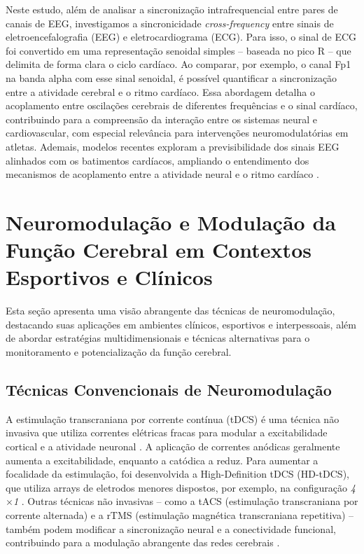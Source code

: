 Neste estudo, além de analisar a sincronização intrafrequencial entre pares de canais de EEG, investigamos a sincronicidade \textit{cross-frequency} entre sinais de eletroencefalografia (EEG) e eletrocardiograma (ECG). Para isso, o sinal de ECG foi convertido em uma representação senoidal simples – baseada no pico R – que delimita de forma clara o ciclo cardíaco. Ao comparar, por exemplo, o canal Fp1 na banda alpha com esse sinal senoidal, é possível quantificar a sincronização entre a atividade cerebral e o ritmo cardíaco. Essa abordagem detalha o acoplamento entre oscilações cerebrais de diferentes frequências e o sinal cardíaco, contribuindo para a compreensão da interação entre os sistemas neural e cardiovascular, com especial relevância para intervenções neuromodulatórias em atletas. Ademais, modelos recentes exploram a previsibilidade dos sinais EEG alinhados com os batimentos cardíacos, ampliando o entendimento dos mecanismos de acoplamento entre a atividade neural e o ritmo cardíaco \cite{vergara2024exploring}.

\section{Neuromodulação e Modulação da Função Cerebral em Contextos Esportivos e Clínicos}
Esta seção apresenta uma visão abrangente das técnicas de neuromodulação, destacando suas aplicações em ambientes clínicos, esportivos e interpessoais, além de abordar estratégias multidimensionais e técnicas alternativas para o monitoramento e potencialização da função cerebral.

\subsection{Técnicas Convencionais de Neuromodulação}
A estimulação transcraniana por corrente contínua (tDCS) é uma técnica não invasiva que utiliza correntes elétricas fracas para modular a excitabilidade cortical e a atividade neuronal \cite{nitsche2000excitability, okano2013estimulacao, purpura1965intracellular, stagg2011physiological}. A aplicação de correntes anódicas geralmente aumenta a excitabilidade, enquanto a catódica a reduz. Para aumentar a focalidade da estimulação, foi desenvolvida a High-Definition tDCS (HD-tDCS), que utiliza arrays de eletrodos menores dispostos, por exemplo, na configuração \emph{4$\times$1} \cite{villamar2013hdtdcs}. Outras técnicas não invasivas – como a tACS (estimulação transcraniana por corrente alternada) e a rTMS (estimulação magnética transcraniana repetitiva) – também podem modificar a sincronização neural e a conectividade funcional, contribuindo para a modulação abrangente das redes cerebrais \cite{kunze2014high, scheler2019neuromodulation}.

